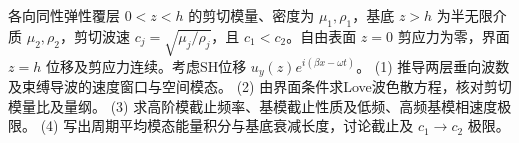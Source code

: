 各向同性弹性覆层 \(0<z<h\) 的剪切模量、密度为 \(\mu_1,\rho_1\)，基底 \(z>h\) 为半无限介质 \(\mu_2,\rho_2\)，剪切波速 \(c_j=\sqrt{\mu_j/\rho_j}\)，且 \(c_1<c_2\)。自由表面 \(z=0\) 剪应力为零，界面 \(z=h\) 位移及剪应力连续。考虑SH位移 \(u_y(z)e^{i(\beta x-\omega t)}\)。
(1) 推导两层垂向波数及束缚导波的速度窗口与空间模态。
(2) 由界面条件求Love波色散方程，核对剪切模量比及量纲。
(3) 求高阶模截止频率、基模截止性质及低频、高频基模相速度极限。
(4) 写出周期平均模态能量积分与基底衰减长度，讨论截止及 \(c_1\to c_2\) 极限。
